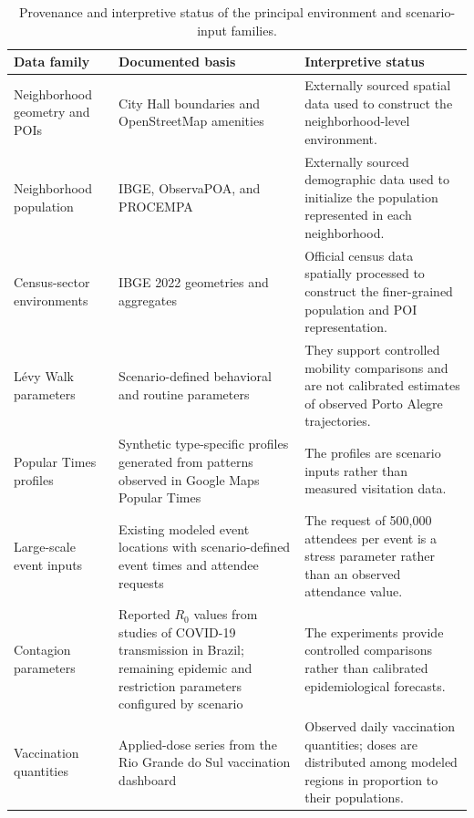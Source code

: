 \begin{table}[ht]
\centering
\footnotesize
\setlength{\tabcolsep}{4pt}
\caption{Provenance and interpretive status of the principal environment and scenario-input families.}
\label{tbl:simulation_data_provenance}
\begin{tabularx}{\linewidth}{@{}p{3.5cm}p{6.2cm}X@{}}
\toprule
\textbf{Data family} & \textbf{Documented basis} & \textbf{Interpretive status} \\
\midrule

Neighborhood geometry and POIs
& City Hall boundaries and OpenStreetMap amenities
& Externally sourced spatial data used to construct the neighborhood-level environment. \\

Neighborhood population
& IBGE, ObservaPOA, and PROCEMPA
& Externally sourced demographic data used to initialize the population represented in each neighborhood. \\

Census-sector environments
& IBGE 2022 geometries and aggregates
& Official census data spatially processed to construct the finer-grained population and POI representation. \\

L\'evy Walk parameters
& Scenario-defined behavioral and routine parameters
& They support controlled mobility comparisons and are not calibrated estimates of observed Porto Alegre trajectories. \\

Popular Times profiles
& Synthetic type-specific profiles generated from patterns observed in Google Maps Popular Times
& The profiles are scenario inputs rather than measured visitation data. \\

Large-scale event inputs
& Existing modeled event locations with scenario-defined event times and attendee requests
& The request of 500,000 attendees per event is a stress parameter rather than an observed attendance value. \\

Contagion parameters
& Reported $R_0$ values from studies of COVID-19 transmission in Brazil; remaining epidemic and restriction parameters configured by scenario
& The experiments provide controlled comparisons rather than calibrated epidemiological forecasts. \\

Vaccination quantities
& Applied-dose series from the Rio Grande do Sul vaccination dashboard
& Observed daily vaccination quantities; doses are distributed among modeled regions in proportion to their populations.\\


\end{tabularx}
\end{table}

